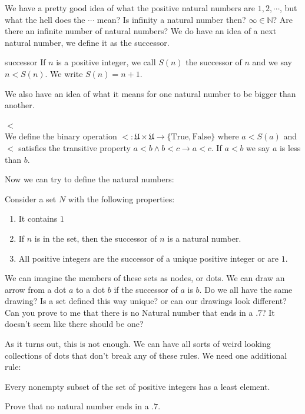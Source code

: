 We have a pretty good idea of what the positive natural numbers are $1,2,\cdots $, but what the hell does the $\cdots$ mean? Is infinity a natural number then? $\infty\in \mathbb{N}$? Are there an infinite number of natural numbers?
\newline
We do have an idea of a next natural number, we define it as the successor.
\begin{defn}{successor}
If $n$ is a positive integer, we call $S(n)$ the successor of $n$ and we say $n<S(n)$. We write $S(n)=n+1$.
\end{defn}
We also have an idea of what it means for one natural number to be bigger than another. 
\begin{defn}{$<$} $ $ \\
We define the binary operation $<:\mathfrak{U}\times \mathfrak{U}\to \{\text{True},\text{False}\}$ where $ a < S(a)$ and $<$ satisfies the transitive property $a<b\land b<c \to a <c$. If $a < b$ we say $a$ is less than $b$.
\end{defn}
Now we can try to define the natural numbers:
\begin{exmp}
Consider a set $N$ with the following properties:
\begin{enumerate}
\item It contains $1$
\item If $n$ is in the set, then the successor of $n$ is a natural number.
\item All positive integers are the successor of a unique positive integer or are $1$.
\end{enumerate}
We can imagine the members of these sets as nodes, or dots. We can draw an arrow from a dot $a$ to a dot $b$ if the successor of $a$ is $b$.
\newline
Do we all have the same drawing? Is a set defined this way unique? or can our drawings look different? Can you prove to me that there is no Natural number that ends in a $.7$? It doesn't seem like there should be one?
\newline
\vspace{2cm}
\end{exmp}


\newpage
As it turns out, this is not enough. We can have all sorts of weird looking collections of dots that don't break any of these rules. We need one additional rule:

\begin{defn}
Every nonempty subset of the set of positive
integers has a least element.
\end{defn}
\begin{exmp} Prove that no natural number ends in a $.7$.
\vspace{3cm}
\end{exmp}


